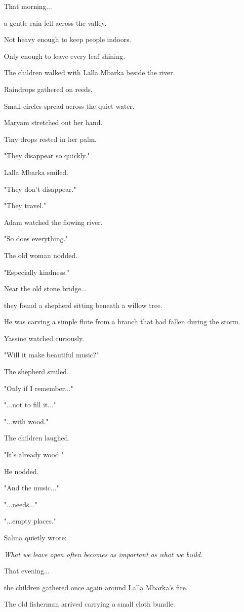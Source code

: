 \documentclass[12pt,openany]{book}
\begin{document}
That morning...

a gentle rain fell across the valley.

Not heavy enough to keep people indoors.

Only enough to leave every leaf shining.

The children walked with Lalla Mbarka beside the river.

Raindrops gathered on reeds.

Small circles spread across the quiet water.

Maryam stretched out her hand.

Tiny drops rested in her palm.

"They disappear so quickly."

Lalla Mbarka smiled.

"They don't disappear."

"They travel."

Adam watched the flowing river.

"So does everything."

The old woman nodded.

"Especially kindness."

Near the old stone bridge...

they found a shepherd sitting beneath a willow tree.

He was carving a simple flute from a branch that had fallen during the storm.

Yassine watched curiously.

"Will it make beautiful music?"

The shepherd smiled.

"Only if I remember..."

"...not to fill it..."

"...with wood."

The children laughed.

"It's already wood."

He nodded.

"And the music..."

"...needs..."

"...empty places."

Salma quietly wrote:

\emph{What we leave open often becomes as important as what we build.}

That evening...

the children gathered once again around Lalla Mbarka's fire.

The old fisherman arrived carrying a small cloth bundle.
\end{document}
